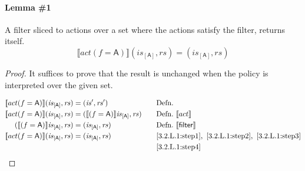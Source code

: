 \documentclass[12pt, letterpaper]{article}
\newcommand\interp[1]{\llbracket #1 \rrbracket}
\begin{document}
 \paragraph{Lemma \#1}
     A filter sliced to actions over a set where the actions satisfy the filter, returns itself.
 \[
     \interp{ act(f=\mathsf{A}) } (\mathit{is}_{[\mathsf{A}]}, \mathit{rs}) = (\mathit{is_{[\mathsf{A}]}}, \mathit{rs})
 \]
 \begin{proof}
     It suffices to prove that the result is unchanged when the policy is interpreted over the given set.
     \par\nobreak
     {\fontsize{10pt}{12pt}\selectfont
     \begin{alignat}{2}
         \setcounter{equation}{0}
         \label{3.2.L.1:step1}
         \interp{ act(f=\mathsf{A}) } (\mathit{is}_{[\mathsf{A}]}, \mathit{rs})
         &= 
         (\mathit{is}', \mathit{rs}')
         &&\quad \text{Defn.}
         \\
         \label{3.2.L.1:step2}
         \interp{ act(f=\mathsf{A}) } (\mathit{is}_{[\mathsf{A}]}, \mathit{rs})
         &= 
         (\interp{ (f=\mathsf{A}) } \mathit{is}_{[\mathsf{A}]}, \mathit{rs})
         &&\quad \text{Defn.}\ \interp{act}\\
         \label{3.2.L.1:step3}
         (\interp{ (f=\mathsf{A}) } \mathit{is}_{[\mathsf{A}]}, \mathit{rs})
         &=
         (\mathit{is}_{[\mathsf{A}]}, \mathit{rs})
         &&\quad \text{Defn.}\ \interp{\mathsf{filter}}\\
         \label{3.2.L.1:step4}
         \interp{ act(f=\mathsf{A}) } (\mathit{is}_{[\mathsf{A}]}, \mathit{rs})
         &=
         (\mathit{is}_{[\mathsf{A}]}, \mathit{rs})
         &&\quad \ref{3.2.L.1:step1},\ \ref{3.2.L.1:step2},\ \ref{3.2.L.1:step3}\\
         \label{3.2.L.1:qed}
         &\qedhere
         &&\quad \ref{3.2.L.1:step4}
     \end{alignat}
     }%
 \end{proof}
\end{document}
